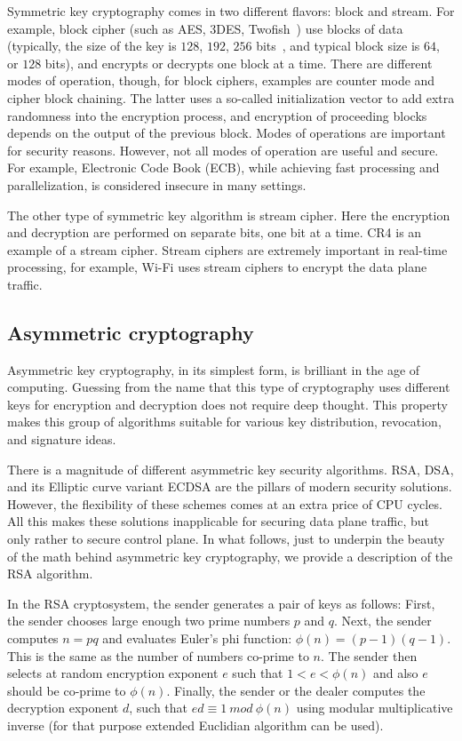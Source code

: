 Symmetric key cryptography comes in two different flavors: block and stream. 
For example, block cipher (such as AES, 3DES, Twofish~\cite{Stinson:Cryptography}) 
use blocks of data (typically, the size of the key is $128$, $192$, $256$ 
bits~\cite{Stinson:Cryptography}, and typical block size is $64$, or $128$ bits), and encrypts or 
decrypts one block at a time. There are different modes of operation, though, 
for block ciphers, examples are counter mode and cipher block chaining. 
The latter uses a so-called initialization vector to add extra randomness into the encryption 
process, and encryption of proceeding blocks depends on the output of the previous 
block. Modes of operations are important for security reasons. However, not all 
modes of operation are useful and secure. For example, Electronic Code Book (ECB), 
while achieving fast processing and parallelization, is considered insecure in 
many settings.

The other type of symmetric key algorithm is stream cipher. Here the encryption 
and decryption are performed on separate bits, one bit at a time. CR4 is an example 
of a stream cipher. Stream ciphers are extremely important in real-time processing, 
for example, Wi-Fi uses stream ciphers to encrypt the data plane traffic.

\subsection{Asymmetric cryptography}

Asymmetric key cryptography, in its simplest form, is brilliant in the age 
of computing. Guessing from the name that this type of cryptography uses different 
keys for encryption and decryption does not require deep thought. This property makes 
this group of algorithms suitable for various key distribution, revocation, and 
signature ideas. 

There is a magnitude of different asymmetric key security algorithms. 
RSA, DSA, and its Elliptic curve variant ECDSA are the pillars of modern 
security solutions. However, the flexibility of these schemes comes at an extra 
price of CPU cycles. All this makes these solutions inapplicable for securing 
data plane traffic, but only rather to secure control plane. In what follows, 
just to underpin the beauty of the math behind asymmetric key cryptography, 
we provide a description of the RSA algorithm.

In the RSA cryptosystem, the sender generates a pair of keys as follows: 
First, the sender chooses large enough two prime numbers $p$ and $q$. Next, 
the sender computes $n=pq$ and evaluates Euler’s phi function: $\phi(n)=(p-1)(q-1)$. 
This is the same as the number of numbers co-prime to $n$. The sender then selects at 
random encryption exponent $e$ such that $1<e<\phi(n)$ and also $e$ should be co-prime to $\phi(n)$.
Finally, the sender or the dealer computes the decryption exponent $d$, such that 
$ed \equiv 1\ mod\ \phi(n)$ using modular multiplicative inverse (for that purpose extended Euclidian 
algorithm can be used).

